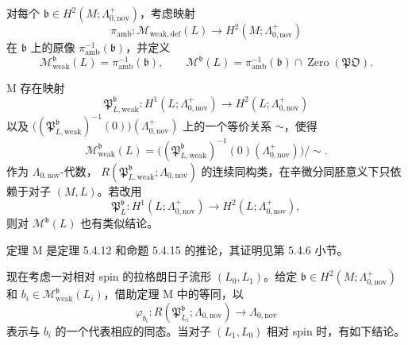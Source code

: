 对每个 $\mathfrak b\in H^2(M;\Lambda^+_{0,\mathrm{nov}})$，考虑映射
\[
  \pi_{\mathrm{amb}}:\mathcal M_{\mathrm{weak,def}}(L)
  \longrightarrow H^2(M;\Lambda^+_{0,\mathrm{nov}})
\]
在 $\mathfrak b$ 上的原像 $\pi_{\mathrm{amb}}^{-1}(\mathfrak b)$，并定义
\[
  \mathcal M^{\mathfrak b}_{\mathrm{weak}}(L)
  =\pi_{\mathrm{amb}}^{-1}(\mathfrak b),
  \qquad
  \mathcal M^{\mathfrak b}(L)
  =\pi_{\mathrm{amb}}^{-1}(\mathfrak b)
   \cap\operatorname{Zero}(\mathfrak{PO}).
\]

\begin{theorem}{M}\label{thm:intro-M}
存在映射
\[
  \mathfrak P^{\mathfrak b}_{L,\mathrm{weak}}:
  H^1(L;\Lambda^+_{0,\mathrm{nov}})
  \longrightarrow H^2(L;\Lambda^+_{0,\mathrm{nov}})
\]
以及 $\bigl((\mathfrak P^{\mathfrak b}_{L,\mathrm{weak}})^{-1}(0)\bigr)
(\Lambda^+_{0,\mathrm{nov}})$ 上的一个等价关系 $\sim$，使得
\[
  \mathcal M^{\mathfrak b}_{\mathrm{weak}}(L)
  =\bigl((\mathfrak P^{\mathfrak b}_{L,\mathrm{weak}})^{-1}(0)
    (\Lambda^+_{0,\mathrm{nov}})\bigr)/{\sim}.
\]
作为 $\Lambda_{0,\mathrm{nov}}$-代数，
$R(\mathfrak P^{\mathfrak b}_{L,\mathrm{weak}};\Lambda_{0,\mathrm{nov}})$
的连续同构类，在辛微分同胚意义下只依赖于对子 $(M,L)$。若改用
\[
  \mathfrak P^{\mathfrak b}_L:H^1(L;\Lambda^+_{0,\mathrm{nov}})
  \longrightarrow H^2(L;\Lambda^+_{0,\mathrm{nov}}),
\]
则对 $\mathcal M^{\mathfrak b}(L)$ 也有类似结论。
\end{theorem}

定理 M 是定理 5.4.12 和命题 5.4.15 的推论，其证明见第 5.4.6 小节。

现在考虑一对相对 spin 的拉格朗日子流形 $(L_0,L_1)$。给定
$\mathfrak b\in H^2(M;\Lambda^+_{0,\mathrm{nov}})$ 和
$b_i\in\mathcal M^{\mathfrak b}_{\mathrm{weak}}(L_i)$，借助定理 M 中的等同，以
\[
  \varphi_{b_i}:R(\mathfrak P^{\mathfrak b}_{L_i};\Lambda_{0,\mathrm{nov}})
  \longrightarrow\Lambda_{0,\mathrm{nov}}
\]
表示与 $b_i$ 的一个代表相应的同态。当对子 $(L_1,L_0)$ 相对 spin 时，有如下结论。

